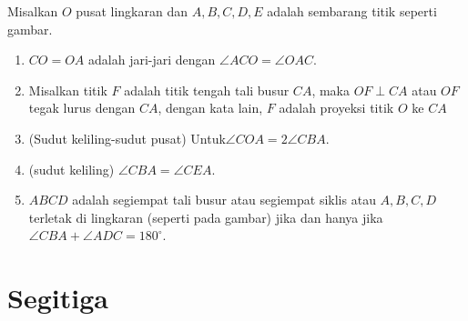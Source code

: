 Misalkan $O$ pusat lingkaran dan $A,B,C,D,E$ adalah sembarang titik seperti gambar.
\begin{enumerate}
    \item $CO=OA$ adalah jari-jari dengan $\angle ACO = \angle OAC$.
    \item Misalkan titik $F$ adalah titik tengah tali busur $CA$, maka $OF \perp CA$ atau $OF$ tegak lurus dengan $CA$, dengan kata lain, $F$ adalah proyeksi titik $O$ ke $CA$
    \item (Sudut keliling-sudut pusat) Untuk$\angle COA = 2\angle CBA$.
    \item (sudut keliling) $\angle CBA = \angle CEA$.
    \item $ABCD$ adalah segiempat tali busur atau segiempat siklis  atau $A,B,C,D$ terletak di lingkaran (seperti pada gambar) jika dan hanya jika $\angle CBA + \angle ADC = 180^\circ$.
\end{enumerate}

\section{Segitiga}

